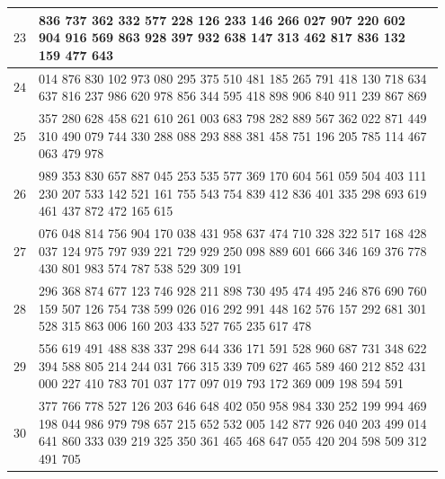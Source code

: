 \documentclass[onefignum, onetabnum]{siamart190516}
\newcommand{\<}{\langle}
\renewcommand{\>}{\rangle}
\begin{document}
\begin{table}[h]
\begin{center}
{\begin{tabular}{|c| >{\centering\arraybackslash} p{0.95\linewidth}|}
 \hline $ 23$ & 96 836 737 362 332 577 228 126 233 146 266 027 907 220 602 904 916 569 863 928 397 932 638 147 313 462 817 836 132 159 477 643 \\
 \hline $ 24$ & 23 014 876 830 102 973 080 295 375 510 481 185 265 791 418 130 718 634 637 816 237 986 620 978 856 344 595 418 898 906 840 911 239 867 869 \\
 \hline $ 25$ & 12 357 280 628 458 621 610 261 003 683 798 282 889 567 362 022 871 449 310 490 079 744 330 288 088 293 888 381 458 751 196 205 785 114 467 063 479 978 \\
 \hline $ 26$ & 14 989 353 830 657 887 045 253 535 577 369 170 604 561 059 504 403 111 230 207 533 142 521 161 755 543 754 839 412 836 401 335 298 693 619 461 437 872 472 165 615 \\
 \hline $ 27$ &  41 076 048 814 756 904 170 038 431 958 637 474 710 328 322 517 168 428 037 124 975 797 939 221 729 929 250 098 889 601 666 346 169 376 778 430 801 983 574 787 538 529 309 191 \\
 \hline $ 28$ &  254 296 368 874 677 123 746 928 211 898 730 495 474 495 246 876 690 760 159 507 126 754 738 599 026 016 292 991 448 162 576 157 292 681 301 528 315 863 006 160 203 433 527 765 235 617 478 \\
 \hline $ 29$ & 3 556 619 491 488 838 337 298 644 336 171 591 528 960 687 731 348 622 394 588 805 214 244 031 766 315 339 709 627 465 589 460 212 852 431 000 227 410 783 701 037 177 097 019 793 172 369 009 198 594 591 \\
 \hline $ 30$ &  112 377 766 778 527 126 203 646 648 402 050 958 984 330 252 199 994 469 198 044 986 979 798 657 215 652 532 005 142 877 926 040 203 499 014 641 860 333 039 219 325 350 361 465 468 647 055 420 204 598 509 312 491 705 \\
  \hline
\end{tabular}
}
\end{center}
\label{tbl:squaregrid}
\end{table}
\end{document}
